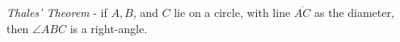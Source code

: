 \documentclass[preview]{standalone}
\begin{document}
\begin{center}
\textit{Thales' Theorem} - if $A,B$, and $C$ lie on a circle, with line $\overline{AC}$ as the diameter, then $\angle ABC$ is a right-angle.
\end{center}
\end{document}
